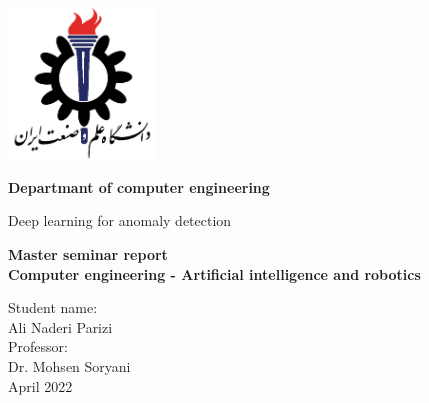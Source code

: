 \documentclass[12pt,a4paper]{report}
\theoremstyle{definition}
\theoremstyle{theorem}
\theoremstyle{definition}
\begin{document}
\begin{latin}
\thispagestyle{empty}

	\vspace*{25mm}
	\centerline{\includegraphics[height=4cm]{./images/logos/iust.png}}

	\begin{center}
	\textbf{
Departmant of computer engineering
	}
	\\[1cm]
	\baselineskip=2cm
	{\titr
	\begin{Huge}
	Deep learning for anomaly detection\\[1cm]
	\end{Huge}}
	{\Large 
		\textbf{
			Master seminar report \\
Computer engineering - Artificial intelligence and robotics
		} \\[1cm]
	}

	{\Large { Student name:}
	\\
	{\Large  Ali Naderi Parizi}
	\\[.5cm]
	{\Large  Professor:}
	\\
	{\Large Dr.  Mohsen Soryani}
	\\[.6cm]
	}
April 2022
	\end{center}

\end{latin}
\end{document}
